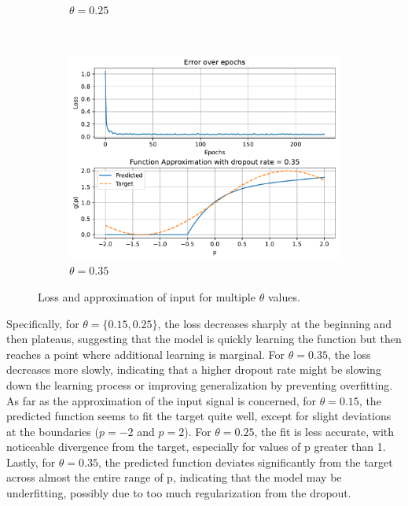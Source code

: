 \begin{figure}[htpb]
\begin{subfigure}{0.47\textwidth}
		\caption{$\theta=0.25$}
	\end{subfigure}\\
	\vspace{1cm}
	\begin{subfigure}{0.47\textwidth}
		\centering
		\includegraphics[width=\textwidth]{../Problem 5/nn_1_12_1_0.35.pdf}
		\caption{$\theta=0.35$}
	\end{subfigure}
	\caption{Loss and approximation of input for multiple $\theta$ values.}
	\label{fig:prob5_1_12_1_all_dropout}
\end{figure}

Specifically, for $\theta = \{0.15, 0.25\}$, the loss decreases sharply at the beginning and then plateaus, suggesting that the model is quickly learning the function but then reaches a point where additional learning is marginal.
For $\theta = 0.35$, the loss decreases more slowly, indicating that a higher dropout rate might be slowing down the learning process or improving generalization by preventing overfitting.\\

As far as the approximation of the input signal is concerned, 
for $\theta = 0.15$, the predicted function seems to fit the target quite well, except for slight deviations at the boundaries ($p = -2$ and $p = 2$).
For $\theta = 0.25$, the fit is less accurate, with noticeable divergence from the target, especially for values of p greater than 1.
Lastly, for $\theta = 0.35$, the predicted function deviates significantly from the target across almost the entire range of p, indicating that the model may be underfitting, possibly due to too much regularization from the dropout.
